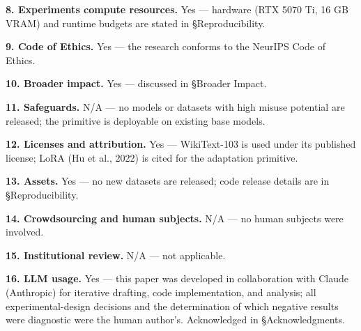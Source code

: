 \textbf{8. Experiments compute resources.} Yes --- hardware (RTX 5070 Ti, 16 GB VRAM) and runtime budgets are stated in §Reproducibility.

\textbf{9. Code of Ethics.} Yes --- the research conforms to the NeurIPS Code of Ethics.

\textbf{10. Broader impact.} Yes --- discussed in §Broader Impact.

\textbf{11. Safeguards.} N/A --- no models or datasets with high misuse potential are released; the primitive is deployable on existing base models.

\textbf{12. Licenses and attribution.} Yes --- WikiText-103 is used under its published license; LoRA (Hu et al., 2022) is cited for the adaptation primitive.

\textbf{13. Assets.} Yes --- no new datasets are released; code release details are in §Reproducibility.

\textbf{14. Crowdsourcing and human subjects.} N/A --- no human subjects were involved.

\textbf{15. Institutional review.} N/A --- not applicable.

\textbf{16. LLM usage.} Yes --- this paper was developed in collaboration with Claude (Anthropic) for iterative drafting, code implementation, and analysis; all experimental-design decisions and the determination of which negative results were diagnostic were the human author's. Acknowledged in §Acknowledgments.
